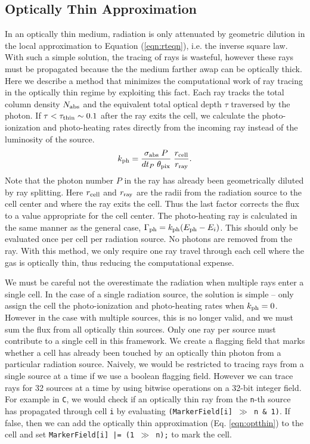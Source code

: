 \documentclass[useAMS,usenatbib,a4paper]{mn2e}
\begin{document}
\subsection{Optically Thin Approximation}

In an optically thin medium, radiation is only attenuated by geometric
dilution in the local approximation to Equation (\ref{eqn:rteqn}),
i.e. the inverse square law.  With such a simple solution, the tracing
of rays is wasteful, however these rays must be propagated because the
the medium farther awap can be optically thick.  Here we describe a
method that minimizes the computational work of ray tracing in the
optically thin regime by exploiting this fact.  Each ray tracks the
total column density $N_{\rm abs}$ and the equivalent total optical
depth $\tau$ traversed by the photon.  If $\tau < \tau_{\rm thin} \sim
0.1$ after the ray exits the cell, we calculate the photo-ionization
and photo-heating rates directly from the incoming ray instead of the
luminosity of the source.
\begin{equation}
  \label{eqn:optthin}
  k_{\rm ph} = \frac{\sigma_{\rm abs} \; P}{dt_P \; \theta_{\rm pix}}
  \; \frac{r_{\rm cell}}{r_{\rm ray}}.
\end{equation}
Note that the photon number $P$ in the ray has already been
geometrically diluted by ray splitting.  Here $r_{\rm cell}$ and
$r_{\rm ray}$ are the radii from the radiation source to the cell
center and where the ray exits the cell.  Thus the last factor
corrects the flux to a value appropriate for the cell center.  The
photo-heating ray is calculated in the same manner as the general
case, $\Gamma_{\rm ph} = k_{\rm ph} (E_{\rm ph} - E_i)$.  This should
only be evaluated once per cell per radiation source.  No photons are
removed from the ray.  With this method, we only require one ray
travel through each cell where the gas is optically thin, thus
reducing the computational expense.

We must be careful not the overestimate the radiation when multiple
rays enter a single cell.  In the case of a single radiation source,
the solution is simple -- only assign the cell the photo-ionization
and photo-heating rates when $k_{\rm ph} = 0$.  However in the case
with multiple sources, this is no longer valid, and we must sum the
flux from all optically thin sources.  Only one ray per source must
contribute to a single cell in this framework.  We create a flagging
field that marks whether a cell has already been touched by an
optically thin photon from a particular radiation source.  Naively, we
would be restricted to tracing rays from a single source at a time if
we use a boolean flagging field.  However we can trace rays for 32
sources at a time by using bitwise operations on a 32-bit integer
field.  For example in \texttt{C}, we would check if an optically thin
ray from the \texttt{n}-th source has propagated through cell
\texttt{i} by evaluating \texttt{(MarkerField[i] $\gg$ n \& 1)}.  If
false, then we can add the optically thin approximation
(Eq. \ref{eqn:optthin}) to the cell and set \texttt{MarkerField[i] |=
  (1 $\gg$ n);} to mark the cell.
\end{document}
